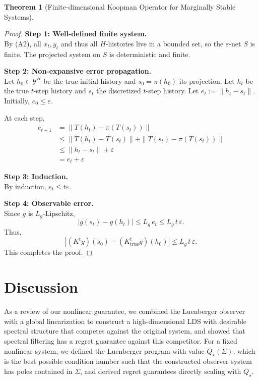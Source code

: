 \documentclass[11pt]{article}
\def\epsilon{\varepsilon}
\newtheorem{theorem}{Theorem}[section]
\numberwithin{equation}{section}
\begin{document}
{\begin{theorem}[Finite-dimensional Koopman Operator for Marginally Stable Systems]
\end{theorem}

\begin{proof}
\textbf{Step 1: Well-defined finite system.}\\
By (A2), all $x_t, y_t$ and thus all $H$-histories live in a bounded set, so the $\epsilon$-net $S$ is finite. The projected system on $S$ is deterministic and finite.

\textbf{Step 2: Non-expansive error propagation.}\\
Let $h_0 \in \mathcal{Y}^H$ be the true initial history and $s_0 = \pi(h_0)$ its projection. Let $h_t$ be the true $t$-step history and $s_t$ the discretized $t$-step history. Let $e_t := \|h_t - s_t\|$. Initially, $e_0 \leq \epsilon$.

At each step,
\begin{align*}
e_{t+1} &= \| T(h_t) - \pi(T(s_t)) \| \\
&\leq \| T(h_t) - T(s_t) \| + \| T(s_t) - \pi(T(s_t)) \| \\
&\leq \| h_t - s_t \| + \epsilon \\
&= e_t + \epsilon
\end{align*}

\textbf{Step 3: Induction.}\\
By induction, $e_t \leq t \epsilon$.

\textbf{Step 4: Observable error.}\\
Since $g$ is $L_g$-Lipschitz,
\[
|g(s_t) - g(h_t)| \leq L_g\, e_t \leq L_g\, t\, \epsilon.
\]
Thus,
\[
\left| (K^t g)(s_0) - (K_{\mathrm{true}}^t g)(h_0) \right| \leq L_g\, t\, \epsilon.
\]
This completes the proof.
\end{proof}
}

\section{Discussion}
\label{sec:discussion}

As a review of our nonlinear guarantee, we combined the Luenberger observer with a global linearization to construct a high-dimensional LDS with desirable spectral structure that competes against the original system, and showed that spectral filtering has a regret guarantee against this competitor. For a fixed nonlinear system, we defined the Luenberger program with value $Q_\star(\Sigma)$, which is the best possible condition number such that the constructed observer system has poles contained in $\Sigma$, and derived regret guarantees directly scaling with $Q_\star$.
\end{document}
